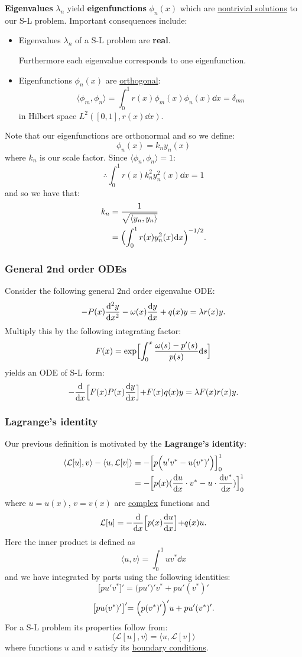 \documentclass{article}
\begin{document}
\textbf{Eigenvalues} $\lambda_n$ yield \textbf{eigenfunctions} $\phi_n(x)$
which are \underline{nontrivial solutions} to our S-L problem. Important consequences include:
\begin{itemize}
    \item Eigenvalues $\lambda_n$ of a S-L problem are \textbf{real}. 
    
    Furthermore each eigenvalue corresponds to one eigenfunction.

    \item Eigenfunctions $\phi_n(x)$ are \underline{orthogonal}:
    $$\langle \phi_m,\phi_n \rangle
    =\int_{0}^{1}r(x)\phi_m(x)\phi_n(x) \dd x=\delta_{mn}$$
    in Hilbert space $L^2([0,1],r(x)\dd x)$.
\end{itemize}

Note that our eigenfunctions are orthonormal and so we define:
$$\phi_n(x)=k_n y_n(x)$$
where $k_n$ is our scale factor.
Since $\langle \phi_n,\phi_n \rangle=1$:
$$\therefore\int_{0}^{1}r(x)k_n^2y_n^2(x)\dd x=1$$
and so we have that:
\begin{align*}
    k_n
    &=\frac{1}{\sqrt{\langle y_n,y_n \rangle}} \\
    &=\Bigl(\int_{0}^{1}r(x)y_n^2(x)\dd x\Bigl)^{-1/2}.
\end{align*}

\newpage

\subsubsection{General 2nd order ODEs}
Consider the following general 2nd order eigenvalue ODE:
$$-P(x)\dv[2]{y}{x}-\omega(x)\dv{y}{x}+q(x)y=\lambda r(x)y.$$
Multiply this by the following integrating factor:
$$F(x)=\exp\Bigl[\int_{0}^{x}
\frac{\omega(s)-p'(s)}{p(s)}\dd s\Bigl]$$
yields an ODE of S-L form:
$$-\dv{x}\Bigl[F(x)P(x)\dv{y}{x}\Bigl]
+F(x)q(x)y=\lambda F(x)r(x)y.$$

\subsubsection{Lagrange's identity}
Our previous definition is motivated by the \textbf{Lagrange's identity}:
\begin{align*}
    \langle \mathcal{L}[u], v \rangle - \langle u, \mathcal{L}[v] \rangle
    &=-\Bigl[p\Bigl(u'v^*-u(v^*)'\Bigl)\Bigl]_{0}^{1} \\
    &=-\Bigl[p(x)(\dv{u}{x}\cdot v^*-u\cdot\dv{v^*}{x})\Bigl]_{0}^{1}
\end{align*}
where $u=u(x)$, $v=v(x)$ are \underline{complex} functions and
$$\mathcal{L}[u]=-\dv{x}\Bigl[p(x)\dv{u}{x}\Bigl]+q(x)u.$$
Here the inner product is defined as
$$\langle u,v \rangle=\int_{0}^{1}uv^* \dd x$$
and we have integrated by parts using the following identities:
$$\bigl[pu'v^*\bigl]'=\bigl(pu'\bigl)'v^*+pu'(v^*)'$$
$$\bigl[pu(v^*)'\bigl]'=\Bigl(p(v^*)'\Bigl)'u+pu'(v^*)'.$$
For a S-L problem its properties follow from:
$$\langle \mathcal{L}[u], v \rangle=\langle u, \mathcal{L}[v] \rangle$$
where functions $u$ and $v$
satisfy its \underline{boundary conditions}.
\end{document}

